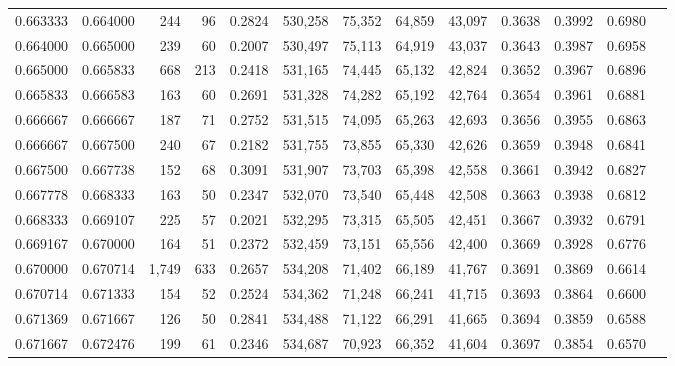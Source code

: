 \begin{tabular}{rrrrrrrrrrrrr}
0.663333 & 0.664000 &   244 &  96 &                                     0.2824 & 530,258 &  75,352 &  64,859 &  43,097 & 0.3638 & 0.3992 & 0.6980 \\
0.664000 & 0.665000 &   239 &  60 &                                     0.2007 & 530,497 &  75,113 &  64,919 &  43,037 & 0.3643 & 0.3987 & 0.6958 \\
0.665000 & 0.665833 &   668 & 213 &                                     0.2418 & 531,165 &  74,445 &  65,132 &  42,824 & 0.3652 & 0.3967 & 0.6896 \\
0.665833 & 0.666583 &   163 &  60 &                                     0.2691 & 531,328 &  74,282 &  65,192 &  42,764 & 0.3654 & 0.3961 & 0.6881 \\
0.666667 & 0.666667 &   187 &  71 &                                     0.2752 & 531,515 &  74,095 &  65,263 &  42,693 & 0.3656 & 0.3955 & 0.6863 \\
0.666667 & 0.667500 &   240 &  67 &                                     0.2182 & 531,755 &  73,855 &  65,330 &  42,626 & 0.3659 & 0.3948 & 0.6841 \\
0.667500 & 0.667738 &   152 &  68 &                                     0.3091 & 531,907 &  73,703 &  65,398 &  42,558 & 0.3661 & 0.3942 & 0.6827 \\
0.667778 & 0.668333 &   163 &  50 &                                     0.2347 & 532,070 &  73,540 &  65,448 &  42,508 & 0.3663 & 0.3938 & 0.6812 \\
0.668333 & 0.669107 &   225 &  57 &                                     0.2021 & 532,295 &  73,315 &  65,505 &  42,451 & 0.3667 & 0.3932 & 0.6791 \\
0.669167 & 0.670000 &   164 &  51 &                                     0.2372 & 532,459 &  73,151 &  65,556 &  42,400 & 0.3669 & 0.3928 & 0.6776 \\
0.670000 & 0.670714 & 1,749 & 633 &                                     0.2657 & 534,208 &  71,402 &  66,189 &  41,767 & 0.3691 & 0.3869 & 0.6614 \\
0.670714 & 0.671333 &   154 &  52 &                                     0.2524 & 534,362 &  71,248 &  66,241 &  41,715 & 0.3693 & 0.3864 & 0.6600 \\
0.671369 & 0.671667 &   126 &  50 &                                     0.2841 & 534,488 &  71,122 &  66,291 &  41,665 & 0.3694 & 0.3859 & 0.6588 \\
0.671667 & 0.672476 &   199 &  61 &                                     0.2346 & 534,687 &  70,923 &  66,352 &  41,604 & 0.3697 & 0.3854 & 0.6570 \\

\end{tabular}
